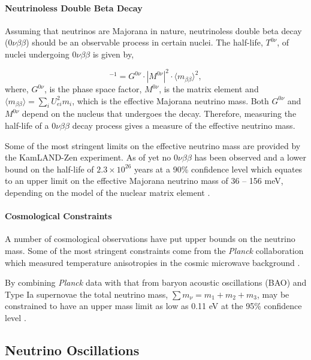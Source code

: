 \paragraph{Neutrinoless Double Beta Decay}
Assuming that neutrinos are Majorana in nature, neutrinoless double beta decay (0$\nu\beta\beta$) should be an observable process in certain nuclei. The half-life, $T^{0\nu}$, of nuclei undergoing $0\nu\beta\beta$ is given by, 

\begin{equation}
    [T^{0\nu}]^{-1} = G^{0\nu} \cdot |M^{0\nu}|^2 \cdot \langle m_{\beta\beta}\rangle^2,
\end{equation}
where, $G^{0\nu}$, is the phase space factor, $M^{0\nu}$, is the matrix element and $\langle m_{\beta\beta}\rangle = \sum_i U^2_{ei}m_i$, which is the effective Majorana neutrino mass. Both $G^{0\nu}$ and $M^{0\nu}$ depend on the nucleus that undergoes the decay. Therefore, measuring the half-life of a $0\nu\beta\beta$ decay process gives a measure of the effective neutrino mass. 

Some of the most stringent limits on the effective neutrino mass are provided by the KamLAND-Zen experiment. As of yet no $0\nu\beta\beta$ has been observed and a lower bound on the half-life of $2.3 \times 10^{26}$ years at a 90\% confidence level which equates to an upper limit on the effective Majorana neutrino mass of 36 -- 156 meV, depending on the model of the nuclear matrix element \cite{kamlandZen}.

\paragraph{Cosmological Constraints}
A number of cosmological observations have put upper bounds on the neutrino mass. Some of the most stringent constraints come from the \textit{Planck} collaboration which measured temperature anisotropies in the cosmic microwave background \cite{PDG_2022}\cite{planck_2018}. 

By combining \textit{Planck} data with that from baryon acoustic oscillations (BAO) and Type Ia supernovae the total neutrino mass, $\sum m_\nu = m_1 + m_2 + m_3$, may be constrained to have an upper mass limit as low as 0.11 eV at the 95\% confidence level \cite{PDG_2022}\cite{planck_2018}.

\subsection{Neutrino Oscillations}\label{subsec:Neutrino Oscillations}

